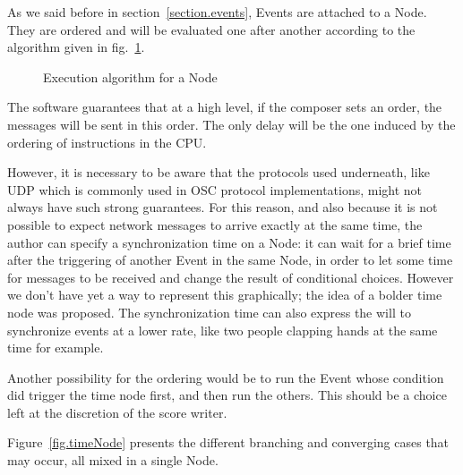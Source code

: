 \documentclass{article}
\begin{document}
	As we said before in section~\ref{section.events}, Events are attached to a Node. They are ordered  and will be evaluated one after another according to the algorithm given in fig.~\ref{fig.algTimeNode}. 
	\begin{figure}[h]
		\begin{algorithmic}
			
			\Repeat
			\EndFor
			\Else
			\Repeat
			\Else
			\EndIf
			\EndFor
			\EndIf       
			
			\EndIf
		\end{algorithmic}
	
	\caption{Execution algorithm for a Node}
	\label{fig.algTimeNode}
	\end{figure}
	
	The software guarantees that at a high level, if the composer sets an order, the messages will be sent in this order. The only delay will be the one induced by the ordering of instructions in the CPU.
	
	However, it is necessary to be aware that the protocols used underneath, like UDP which is commonly used in OSC protocol implementations, might not always have such strong guarantees.
	For this reason, and also because it is not possible to expect network messages to arrive exactly at the same time, the author can specify a synchronization time on a Node: it can wait for a brief time after the triggering of another Event in the same Node, in order to let some time for messages to be received and change the result of conditional choices. However we don't have yet a way to represent this graphically; the idea of a bolder time node was proposed.
	The synchronization time can also express the will to synchronize events at a lower rate, like two people clapping hands at the same time for example.
	
	Another possibility for the ordering would be to run the Event whose condition did trigger the time node first, and then run the others. This should be a choice left at the discretion of the score writer.
	
	Figure~\ref{fig.timeNode} presents the different branching and converging cases that may occur, all mixed in a single Node. 
	
\end{document}
